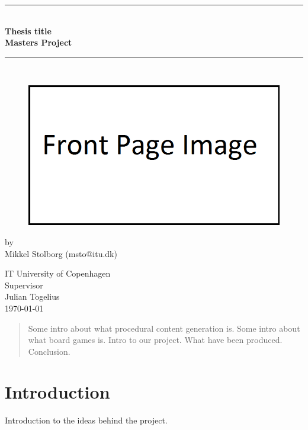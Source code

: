 \documentclass[a4paper,11pt]{article}
\begin{document}
\lstset{language=C}  
\begin{titlepage}

\centering \parindent=0pt
\newcommand{\HRule}{\rule{\textwidth}{1mm}}
 \HRule\\[1cm]\large\bfseries
Thesis title\\[0.7cm]
\large Masters Project\\[1cm]
\HRule\\[1cm]

\begin{figure}[h]
	\centering
    \includegraphics[width=1\textwidth]{Images/FrontPage.png}
    \label{fig:frontPage}
\end{figure}
\large by 
\\Mikkel Stolborg (msto@itu.dk)
 \normalsize
\begin{flushleft}
IT University of Copenhagen \\
Supervisor\\
Julian Togelius\\
\today \end{flushleft}
\end{titlepage}

\begin{abstract}
Some intro about what procedural content generation is.
Some intro about what board games is.
Intro to our project.
What have been produced.
Conclusion.
\end{abstract}
\pagebreak
\tableofcontents
\pagebreak
\section{Introduction}
Introduction to the ideas behind the project. 
\end{document}
